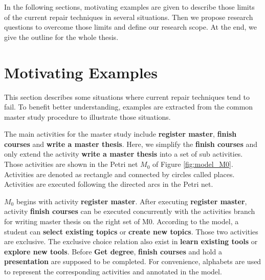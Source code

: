 In the following sections, motivating examples are given to describe those limits of the current repair techniques in several situations. Then we propose research questions to overcome those limits and define our research scope. At the end, we give the outline for the whole thesis.
\section{Motivating Examples}

This section describes some situations where current repair techniques tend to fail. To benefit better understanding, examples are extracted from the common master study procedure to illustrate those situations.

The main activities for the master study include \textbf{register master}, \textbf{finish courses} and \textbf{write a master thesis}. Here, we simplify the \textbf{finish courses} and only extend the activity \textbf{write a master thesis} into a set of sub activities. Those activities are shown in the Petri net $M_0$ of Figure \ref{fig:model_M0}.  Activities are denoted as rectangle and connected by circles called places. Activities are executed following the directed arcs in the Petri net.  

$M_0$ begins with activity \textbf{register master}. After executing \textbf{register master},  activity \textbf{finish courses}  can be executed concurrently with the activities branch for writing master thesis on the right set of M0. According to the model, a student can \textbf{select existing topics}  or \textbf{create new topics}. Those two activities are exclusive. The exclusive choice relation also exist in  \textbf{learn existing tools}  or \textbf{explore new tools}. Before  \textbf{Get degree}, \textbf{finish courses} and hold a \textbf{presentation} are supposed to be completed. For convenience, alphabets are used to represent the corresponding activities and annotated in the model.

